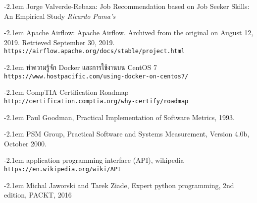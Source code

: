 \documentclass{itkmitlcoop}
\makeatletter
\def\bibindent{2.1em}
\let\old@bibitem\bibitem
\def\bibitem#1{\old@bibitem{#1}\leavevmode\kern-\bibindent}
\makeatother
\begin{document}
\begin{thebibliography}{9}
  Jorge Valverde-Rebaza: Job Recommendation based on Job Seeker Skills: An Empirical Study
  \textit{Ricardo Puma's}

  Apache Airflow: Apache Airflow. Archived from the original on August 12, 2019. Retrieved September 30, 2019.
  \\\texttt{https://airflow.apache.org/docs/stable/project.html}

  ทำความรู้จัก Docker และการใช้งานบน CentOS 7
  \\\texttt{https://www.hostpacific.com/using-docker-on-centos7/}

  CompTIA Certification Roadmap
  \\\texttt{http://certification.comptia.org/why-certify/roadmap}

  Paul Goodman, Practical Implementation of Software Metrics, 1993.
  
  PSM Group, Practical Software and Systems Measurement, Version 4.0b, October 2000.

  application programming interface (API), wikipedia
  \\\texttt{https://en.wikipedia.org/wiki/API}

  Michal Jaworski and Tarek Ziade, Expert python programming, 2nd edition, PACKT, 2016

  \end{thebibliography}

  

\newpage


% 
\end{document}

